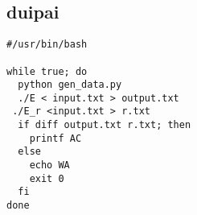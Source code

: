 \documentclass[twoside]{article}
\begin{document}
\subsection{duipai}
\begin{lstlisting}
#/usr/bin/bash

while true; do
  python gen_data.py
  ./E < input.txt > output.txt
 ./E_r <input.txt > r.txt
  if diff output.txt r.txt; then
    printf AC
  else
    echo WA
    exit 0
  fi
done

\end{lstlisting}
\end{document}
